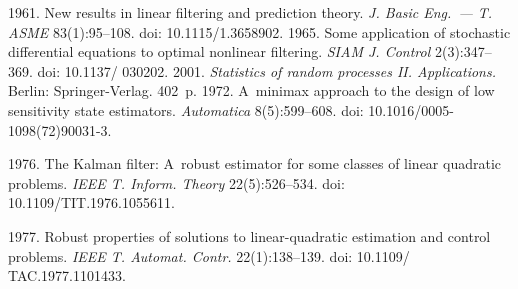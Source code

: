   \begin{multicols}{2}

\renewcommand{\bibname}{\protect\rmfamily References}

{\small\frenchspacing
 {%
 \begin{thebibliography}{99} 
       1961. New results in linear filtering and prediction 
theory. \textit{J. Basic Eng.~--- T. ASME} 83(1):95--108. doi: 10.1115/1.3658902.
       1965. Some application of stochastic differential equations to optimal 
nonlinear filtering. \textit{SIAM J. Control} 2(3):347--369. doi: 10.1137/ 030202.
       2001. \textit{Statistics of random processes II. 
Applications.} Berlin: Springer-Verlag. 402~p.
       1972. A~minimax approach to the design of 
low sensitivity state estimators. \textit{Automatica} 8(5):599--608. doi: 10.1016/0005-1098(72)90031-3.

       1976. The Kalman filter: A~robust estimator for some classes of linear 
quadratic problems. \textit{IEEE T. Inform. Theory} 22(5):526--534. doi: 10.1109/TIT.1976.1055611.

       1977. Robust properties of solutions to linear-quadratic estimation and 
control problems. \textit{IEEE T. Automat. Contr.} 22(1):138--139. doi: 10.1109/ TAC.1977.1101433.


\end{thebibliography}}}
\end{multicols}

